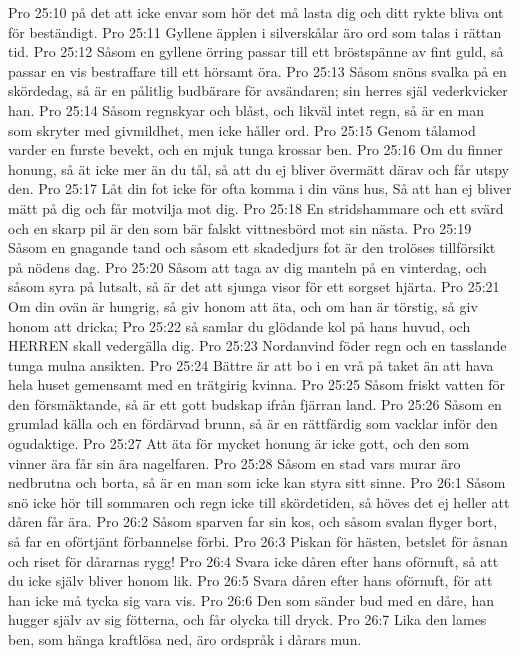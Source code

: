 Pro 25:10  på det att icke envar som hör det må lasta dig och ditt rykte bliva ont för beständigt.
Pro 25:11  Gyllene äpplen i silverskålar äro ord som talas i rättan tid.
Pro 25:12  Såsom en gyllene örring passar till ett bröstspänne av fint guld, så passar en vis bestraffare till ett hörsamt öra.
Pro 25:13  Såsom snöns svalka på en skördedag, så är en pålitlig budbärare för avsändaren; sin herres själ vederkvicker han.
Pro 25:14  Såsom regnskyar och blåst, och likväl intet regn, så är en man som skryter med givmildhet, men icke håller ord.
Pro 25:15  Genom tålamod varder en furste bevekt, och en mjuk tunga krossar ben.
Pro 25:16  Om du finner honung, så ät icke mer än du tål, så att du ej bliver övermätt därav och får utspy den.
Pro 25:17  Låt din fot icke för ofta komma i din väns hus, Så att han ej bliver mätt på dig och får motvilja mot dig.
Pro 25:18  En stridshammare och ett svärd och en skarp pil är den som bär falskt vittnesbörd mot sin nästa.
Pro 25:19  Såsom en gnagande tand och såsom ett skadedjurs fot är den trolöses tillförsikt på nödens dag.
Pro 25:20  Såsom att taga av dig manteln på en vinterdag, och såsom syra på lutsalt, så är det att sjunga visor för ett sorgset hjärta.
Pro 25:21  Om din ovän är hungrig, så giv honom att äta, och om han är törstig, så giv honom att dricka;
Pro 25:22  så samlar du glödande kol på hans huvud, och HERREN skall vedergälla dig.
Pro 25:23  Nordanvind föder regn och en tasslande tunga mulna ansikten.
Pro 25:24  Bättre är att bo i en vrå på taket än att hava hela huset gemensamt med en trätgirig kvinna.
Pro 25:25  Såsom friskt vatten för den försmäktande, så är ett gott budskap ifrån fjärran land.
Pro 25:26  Såsom en grumlad källa och en fördärvad brunn, så är en rättfärdig som vacklar inför den ogudaktige.
Pro 25:27  Att äta för mycket honung är icke gott, och den som vinner ära får sin ära nagelfaren.
Pro 25:28  Såsom en stad vars murar äro nedbrutna och borta, så är en man som icke kan styra sitt sinne.
Pro 26:1  Såsom snö icke hör till sommaren och regn icke till skördetiden, så höves det ej heller att dåren får ära.
Pro 26:2  Såsom sparven far sin kos, och såsom svalan flyger bort, så far en oförtjänt förbannelse förbi.
Pro 26:3  Piskan för hästen, betslet för åsnan och riset för dårarnas rygg!
Pro 26:4  Svara icke dåren efter hans oförnuft, så att du icke själv bliver honom lik.
Pro 26:5  Svara dåren efter hans oförnuft, för att han icke må tycka sig vara vis.
Pro 26:6  Den som sänder bud med en dåre, han hugger själv av sig fötterna, och får olycka till dryck.
Pro 26:7  Lika den lames ben, som hänga kraftlösa ned, äro ordspråk i dårars mun.
